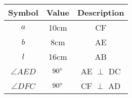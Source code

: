 \begin{tabular}{|c|c|c|}
\hline
Symbol & Value & Description\\
\hline
$a$ & 10cm & CF \\
\hline
$b$ & 8cm & AE \\
\hline
$l$ & 16cm & AB \\
\hline
$\angle{AED}$ & $90\degree$ & AE $\perp$ DC \\
\hline
$\angle{DFC}$ & $90\degree$ & CF $\perp$ AD \\
\hline
\end{tabular}
